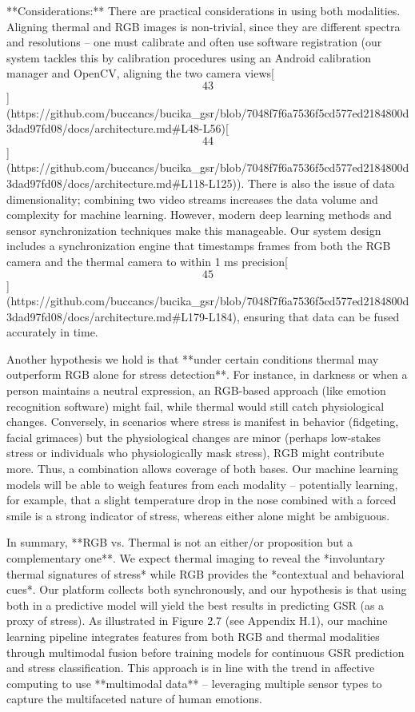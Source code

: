 \documentclass[12pt,a4paper]{article}
\begin{document}
**Considerations:** There are practical considerations in using both
modalities. Aligning thermal and RGB images is non-trivial, since they
are different spectra and resolutions -- one must calibrate and often
use software registration (our system tackles this by calibration
procedures using an Android calibration manager and OpenCV, aligning the
two camera
views[\[43\]](https://github.com/buccancs/bucika_gsr/blob/7048f7f6a7536f5cd577ed2184800d3dad97fd08/docs/architecture.md#L48-L56)[\[44\]](https://github.com/buccancs/bucika_gsr/blob/7048f7f6a7536f5cd577ed2184800d3dad97fd08/docs/architecture.md#L118-L125)).
There is also the issue of data dimensionality; combining two video
streams increases the data volume and complexity for machine learning.
However, modern deep learning methods and sensor synchronization
techniques make this manageable. Our system design includes a
synchronization engine that timestamps frames from both the RGB camera
and the thermal camera to within 1 ms
precision[\[45\]](https://github.com/buccancs/bucika_gsr/blob/7048f7f6a7536f5cd577ed2184800d3dad97fd08/docs/architecture.md#L179-L184),
ensuring that data can be fused accurately in time.

Another hypothesis we hold is that **under certain conditions thermal
may outperform RGB alone for stress detection**. For instance, in
darkness or when a person maintains a neutral expression, an RGB-based
approach (like emotion recognition software) might fail, while thermal
would still catch physiological changes. Conversely, in scenarios where
stress is manifest in behavior (fidgeting, facial grimaces) but the
physiological changes are minor (perhaps low-stakes stress or
individuals who physiologically mask stress), RGB might contribute more.
Thus, a combination allows coverage of both bases. Our machine learning
models will be able to weigh features from each modality -- potentially
learning, for example, that a slight temperature drop in the nose
combined with a forced smile is a strong indicator of stress, whereas
either alone might be ambiguous.

In summary, **RGB vs. Thermal is not an either/or proposition but a
complementary one**. We expect thermal imaging to reveal the
*involuntary thermal signatures of stress* while RGB provides the
*contextual and behavioral cues*. Our platform collects both
synchronously, and our hypothesis is that using both in a predictive
model will yield the best results in predicting GSR (as a proxy of
stress). As illustrated in Figure 2.7 (see Appendix H.1), our machine learning pipeline integrates features from both RGB and thermal modalities through multimodal fusion before training models for continuous GSR prediction and stress classification. This approach is in line with the trend in affective computing
to use **multimodal data** -- leveraging multiple sensor types to
capture the multifaceted nature of human emotions.
\end{document}

